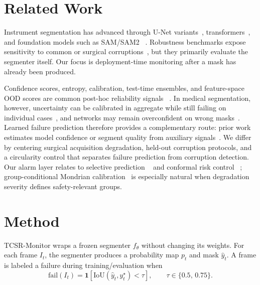 \documentclass[runningheads]{llncs}
\newcommand{\iou}{\mathrm{IoU}}
\newcommand{\monitor}{TCSR-Monitor}
\newcommand{\unet}{U-Net}
\begin{document}
\section{Related Work}

Instrument segmentation has advanced through \unet{} variants~\cite{ref:ronneberger},
transformers~\cite{ref:dong}, and foundation models such as SAM/SAM2
~\cite{ref:kirillov,ref:ravi}. Robustness benchmarks expose sensitivity to
common or surgical corruptions~\cite{ref:hendrycks_c,ref:segstrong,ref:michieli},
but they primarily evaluate the segmenter itself. Our focus is deployment-time
monitoring after a mask has already been produced.

Confidence scores, entropy, calibration, test-time ensembles, and feature-space
OOD scores are common post-hoc reliability signals
~\cite{ref:hendrycks,ref:malinin,ref:guo,ref:lakshmi,ref:lee}. In medical
segmentation, however, uncertainty can be calibrated in aggregate while still
failing on individual cases~\cite{ref:jungo}, and networks may remain
overconfident on wrong masks~\cite{ref:mehrtash}. Learned failure prediction
therefore provides a complementary route: prior work estimates model confidence
or segment quality from auxiliary signals~\cite{ref:corbiere,ref:granese,ref:rottmann,ref:fsnet}.
We differ by centering surgical acquisition degradation, held-out corruption
protocols, and a circularity control that separates failure prediction from
corruption detection. Our alarm layer relates to selective prediction
~\cite{ref:geifman,ref:selectivenet} and conformal risk control
~\cite{ref:vovk,ref:angelo_intro,ref:crc}; group-conditional Mondrian
calibration~\cite{ref:mondrian} is especially natural when degradation severity
defines safety-relevant groups.

\section{Method}

\monitor{} wraps a frozen segmenter $f_\theta$ without changing its weights.
For each frame $I_t$, the segmenter produces a probability map $p_t$ and mask
$\hat y_t$. A frame is labeled a failure during training/evaluation when
\begin{equation}
\mathrm{fail}(I_t)=\mathbf{1}\!\left[\iou(\hat{y}_t,y_t^\star)<\tau\right],
\qquad \tau \in \{0.5,\,0.75\}.
\label{eq:failure_label}
\end{equation}
\end{document}
